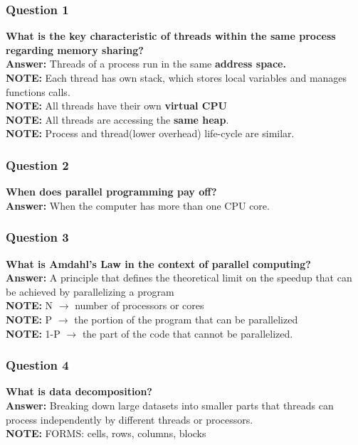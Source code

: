 \documentclass{article}
\begin{document}
\subsubsection*{Question 1}
\textbf{What is the key characteristic of threads within the same process regarding memory sharing?} \\
\textbf{Answer:} Threads of a process run in the same \textbf{address space.} \\
\textbf{NOTE:} Each thread has own stack, which stores local variables and manages functions calls. \\
\textbf{NOTE:} All threads have their own \textbf{virtual CPU} \\
\textbf{NOTE:} All threads are accessing the \textbf{same heap}. \\
\textbf{NOTE:} Process and thread(lower overhead) life-cycle are similar.

\subsubsection*{Question 2}
\textbf{When does parallel programming pay off?} \\
\textbf{Answer:} When the computer has more than one CPU core.

\subsubsection*{Question 3}
\textbf{What is Amdahl's Law in the context of parallel computing?} \\
\textbf{Answer:} A principle that defines the theoretical limit on the speedup that can be achieved by parallelizing a program \\
\textbf{NOTE:} N $\rightarrow$ number of processors or cores \\
\textbf{NOTE:} P $\rightarrow$ the portion of the program that can be parallelized \\
\textbf{NOTE:} 1-P $\rightarrow$ the part of the code that cannot be
parallelized.

\subsubsection*{Question 4}
\textbf{What is data decomposition?} \\
\textbf{Answer:} Breaking down large datasets into smaller parts that threads can process independently by different threads or processors. \\
\textbf{NOTE:} FORMS: cells, rows, columns, blocks
\end{document}
